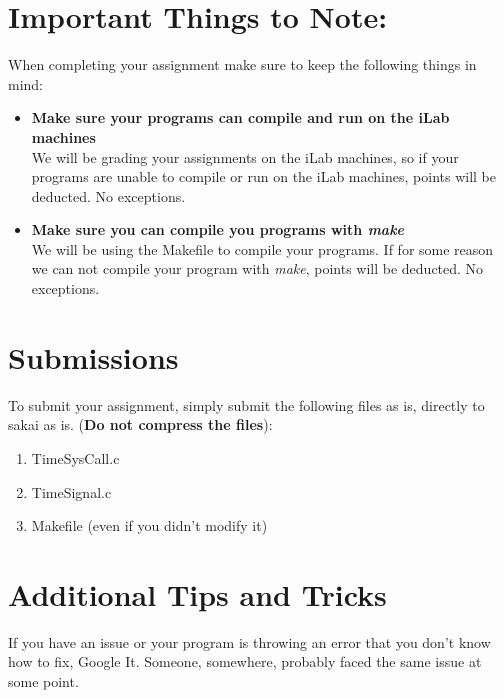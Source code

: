 \documentclass{article}
\begin{document}
\section*{Important Things to Note:}
When completing your assignment make sure to keep the following things in mind:
\begin{itemize}
\item \textbf{Make sure your programs can compile and run on the iLab machines}\\
We will be grading your assignments on the iLab machines, so if your programs are unable to compile or run on the iLab machines, points will be deducted. No exceptions. 
\item \textbf{Make sure you can compile you programs with \textit{make}}\\
We will be using the Makefile to compile your programs. If for some reason we can not compile your program with \textit{make}, points will be deducted. No exceptions. 
\end{itemize}

\section*{Submissions}
To submit your assignment, simply submit the following files as is, directly to sakai as is. (\textbf{Do not compress the files}):
\begin{enumerate}
\item TimeSysCall.c
\item TimeSignal.c
\item Makefile (even if you didn't modify it)
\end{enumerate}

\section*{Additional Tips and Tricks}

\begin{info}
If you have an issue or your program is throwing an error that you don't know how to fix, Google It. Someone, somewhere, probably faced the same issue at some point.
\end{info}
\end{document}
